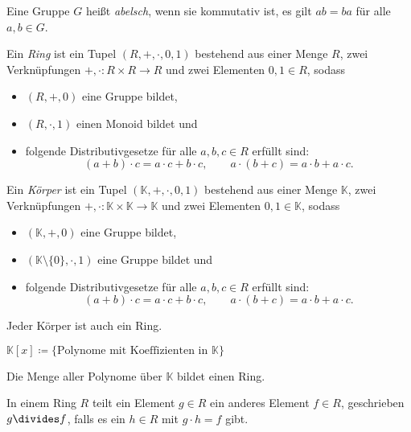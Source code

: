 \documentclass{cheat-sheet}
\newcommand{\K}{\mathbb{K}} %
\begin{document}
\begin{defn}
  Eine Gruppe $G$ heißt \emph{abelsch}, wenn sie kommutativ ist, \dh{} es gilt $ab = ba$ für alle $a, b \in G$.
\end{defn}

\begin{defn}
  Ein \emph{Ring} ist ein Tupel $(R, +, \cdot, 0, 1)$ bestehend aus einer Menge $R$, zwei Verknüpfungen $+, \cdot : R \times R \to R$ und zwei Elementen $0, 1 \in R$, sodass
  \begin{itemize}
    \item $(R, +, 0)$ eine Gruppe bildet,
    \item $(R, \cdot, 1)$ einen Monoid bildet und
    \item folgende Distributivgesetze für alle $a, b, c \in R$ erfüllt sind:
    \[
      (a + b) \cdot c = a \cdot c + b \cdot c, \qquad
      a \cdot (b + c) = a \cdot b + a \cdot c.
    \]
  \end{itemize}
\end{defn}

\begin{defn}
  Ein \emph{Körper} ist ein Tupel $(\K, +, \cdot, 0, 1)$ bestehend aus einer Menge $\K$, zwei Verknüpfungen $+, \cdot : \K \times \K \to \K$ und zwei Elementen $0, 1 \in \K$, sodass
  \begin{itemize}
    \item $(\K, +, 0)$ eine Gruppe bildet,
    \item $(\K \setminus \{ 0 \}, \cdot, 1)$ eine Gruppe bildet und
    \item folgende Distributivgesetze für alle $a, b, c \in R$ erfüllt sind:
    \[
      (a + b) \cdot c = a \cdot c + b \cdot c, \qquad
      a \cdot (b + c) = a \cdot b + a \cdot c.
    \]
  \end{itemize}
\end{defn}

\begin{bem}
  Jeder Körper ist auch ein Ring.
\end{bem}

\begin{nota}
  $\K[x] \coloneqq \{ \text{Polynome mit Koeffizienten in $\K$} \}$
\end{nota}

\begin{bem}
  Die Menge aller Polynome über $\K$ bildet einen Ring.
\end{bem}

\begin{defn}
  In einem Ring $R$ teilt ein Element $g \in R$ ein anderes Element $f \in R$, geschrieben $g \divides f$, falls es ein $h \in R$ mit $g \cdot h = f$ gibt.
\end{defn}
\end{document}
